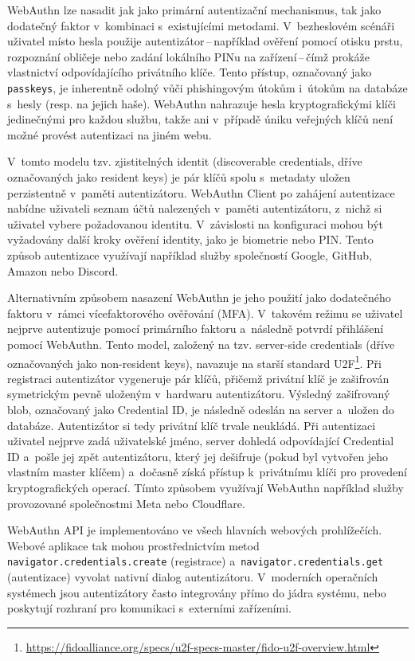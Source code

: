 WebAuthn lze nasadit jak jako primární autentizační mechanismus, tak jako dodatečný faktor v~kombinaci s~existujícími metodami.
V~bezheslovém scénáři uživatel místo hesla použije autentizátor\,--\,například ověření pomocí otisku prstu, rozpoznání obličeje nebo zadání lokálního PINu na zařízení\,--\,čímž prokáže vlastnictví odpovídajícího privátního klíče.
Tento přístup, označovaný jako \texttt{passkeys}, je inherentně odolný vůči phishingovým útokům i~útokům na databáze s~hesly (resp. na jejich haše).
WebAuthn nahrazuje hesla kryptografickými klíči jedinečnými pro každou službu, takže ani v~případě úniku veřejných klíčů není možné provést autentizaci na jiném webu.

V~tomto modelu tzv. zjistitelných identit (discoverable credentials, dříve označovaných jako resident keys) je pár klíčů spolu s~metadaty uložen perzistentně v~paměti autentizátoru.
WebAuthn Client po zahájení autentizace nabídne uživateli seznam účtů nalezených v~paměti autentizátoru, z~nichž si uživatel vybere požadovanou identitu.
V~závislosti na konfiguraci mohou být vyžadovány další kroky ověření identity, jako je biometrie nebo PIN.
Tento způsob autentizace využívají například služby společností Google, GitHub, Amazon nebo Discord.

Alternativním způsobem nasazení WebAuthn je jeho použití jako dodatečného faktoru v~rámci vícefaktorového ověřování (MFA).
V~takovém režimu se uživatel nejprve autentizuje pomocí primárního faktoru a~následně potvrdí přihlášení pomocí WebAuthn.
Tento model, založený na tzv. server-side credentials (dříve označovaných jako non-resident keys), navazuje na starší standard U2F\footnote{\url{https://fidoalliance.org/specs/u2f-specs-master/fido-u2f-overview.html}}.
Při registraci autentizátor vygeneruje pár klíčů, přičemž privátní klíč je zašifrován symetrickým  pevně uloženým v~hardwaru autentizátoru.
Výsledný zašifrovaný blob, označovaný jako Credential ID, je následně odeslán na server a~uložen do databáze.
Autentizátor si tedy privátní klíč trvale neukládá.
Při autentizaci uživatel nejprve zadá uživatelské jméno, server dohledá odpovídající Credential ID a~pošle jej zpět autentizátoru, který jej dešifruje (pokud byl vytvořen jeho vlastním master klíčem) a~dočasně získá přístup k~privátnímu klíči pro provedení kryptografických operací.
Tímto způsobem využívají WebAuthn například služby provozované společnostmi Meta nebo Cloudflare.

WebAuthn API je implementováno ve všech hlavních webových prohlížečích.
Webové aplikace tak mohou prostřednictvím metod \texttt{navigator.credentials.create} (registrace) a~\texttt{navigator.credentials.get} (autentizace) vyvolat nativní dialog autentizátoru.
V~moderních operačních systémech jsou autentizátory často integrovány přímo do jádra systému, nebo poskytují rozhraní pro komunikaci s~externími zařízeními.

